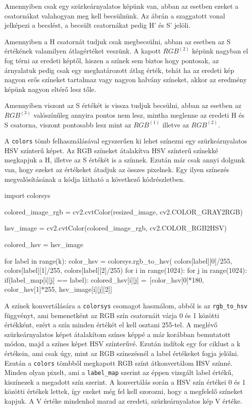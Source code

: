 Amennyiben csak egy szürkeárnyalatos képünk van, abban az esetben ezeket a csatornákat valahogyan meg kell becsülnünk. Az ábrán a szaggatott vonal jelképezi a becslést, a becsült csatornákat pedig H' és S' jelöli.

Amennyiben a H csatornát tudjuk csak megbecsülni, abban az esetben az S értékének valamilyen átlagértéket veszünk. A kapott $RGB^{(2)}$ képünk nagyban el fog térni az eredeti képtől, hiszen a színek sem biztos hogy pontosak, az árnyalatuk pedig csak egy meghatározott átlag érték, tehát ha az eredeti kép nagyon erős színeket tartalmaz vagy nagyon halvány színeket, akkor az eredmény képünk nagyon eltérő lesz tőle.

Amennyiben viszont az S értékét is vissza tudjuk becsülni, abban az esetben az $RGB^{(3)}$ valószínűleg annyira pontos nem lesz, mintha meglenne az eredeti H és S csatorna, viszont pontosabb lesz mint az $RGB^{(1)}$ illetve az $RGB^{(2)}$.

A \texttt{colors} tömb felhasználásával egyszerűen ki lehet színezni egy szürkeárnyalatos HSV színterű képet. Az RGB színeket átalakítva HSV színterű színekké megkapjuk a H, illetve az S értékét is a színnek. Ezután már csak annyi dolgunk van, hogy ezeket az értékeket átadjuk az összes pixelnek. Egy ilyen színezés megvalósításának a kódja látható a következő kódrészletben.
\begin{python}
import colorsys

colored_image_rgb = cv2.cvtColor(resized_image, cv2.COLOR_GRAY2RGB)

hsv_image = cv2.cvtColor(colored_image_rgb, cv2.COLOR_RGB2HSV)

colored_hsv = hsv_image

for label in range(k):
    color_hsv = colorsys.rgb_to_hsv(
        colors[label][0]/255,
        colors[label][1]/255,
        colors[label][2]/255)
    for i in range(1024):
        for j in range(1024):
            if(label_map[i][j] == label):
                colored_hsv[i][j] =\
                [color_hsv[0]*180, color_hsv[1]*255, hsv_image[i][j][2]]
\end{python}

A színek konvertálására a \texttt{colorsys} csomagot használom, abból is az \texttt{rgb\_to\_hsv} függvényt, ami bemenetként az RGB szín csatornáit várja 0 és 1 közötti értékként, ezért a szín minden értékét el kell osztani 255-tel. A meglévő szürkeárnyalatos képet átalakítom színes képpé a már korábban bemutatott módon, majd a színes képet HSV színterűvé. Ezután indítok egy for ciklust a k értékein, ami csak úgy, mint az RGB színezésnél a label értékeket fogja jelölni. Ezután a \texttt{colors} tömbből megkapott RGB színt átkonvertálom HSV színné. Minden olyan pixelt, ami a \texttt{label\_map} szerint az éppen vizsgált label értékű, kiszínezek a megadott szín szerint. A konvertálás során a HSV szín értékei 0 és 1 közötti értékek lettek, így ezeket még fel kell szorozni, hogy a megfelelő színeket kapjuk. A V értéke mindenhol marad az eredeti, szürkeárnyalatos kép V értéke.

